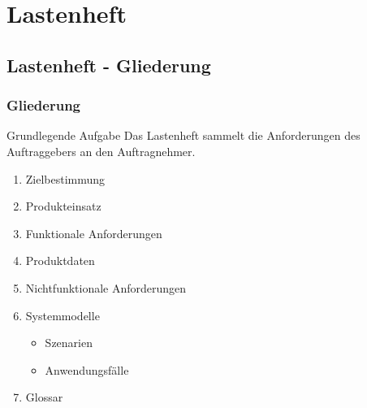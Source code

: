 \documentclass[18pt]{beamer}
\begin{document}
\section{Lastenheft}
	\subsection{Lastenheft - Gliederung}
	\begin{frame}
		\frametitle{Gliederung}
		\begin{block}{Grundlegende Aufgabe}
			Das Lastenheft sammelt die Anforderungen des Auftraggebers an den Auftragnehmer.
		\end{block}
		\begin{enumerate}
			\item \pause Zielbestimmung \pause 
			\item Produkteinsatz \pause
			\item Funktionale Anforderungen \pause 
			\item Produktdaten \pause
			\item Nichtfunktionale Anforderungen \pause 
			\item Systemmodelle
			\begin{itemize}
				\item Szenarien
				\item Anwendungsfälle
			\end{itemize}
			\pause
			\item Glossar 
		\end{enumerate}
	\end{frame}
	
\end{document}
